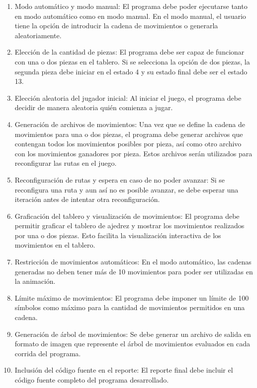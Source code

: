 \begin{enumerate}
    \item Modo automático y modo manual: El programa debe poder ejecutarse tanto en modo automático como en modo manual. En el modo manual, el usuario tiene la opción de introducir la cadena de movimientos o generarla aleatoriamente.
    \newline
    \item Elección de la cantidad de piezas: El programa debe ser capaz de funcionar con una o dos piezas en el tablero. Si se selecciona la opción de dos piezas, la segunda pieza debe iniciar en el estado 4 y su estado final debe ser el estado 13.
    \newline
    \item Elección aleatoria del jugador inicial: Al iniciar el juego, el programa debe decidir de manera aleatoria quién comienza a jugar.
    \newline
    \item Generación de archivos de movimientos: Una vez que se define la cadena de movimientos para una o dos piezas, el programa debe generar archivos que contengan todos los movimientos posibles por pieza, así como otro archivo con los movimientos ganadores por pieza. Estos archivos serán utilizados para reconfigurar las rutas en el juego.
    \newline
    \item Reconfiguración de rutas y espera en caso de no poder avanzar: Si se reconfigura una ruta y aun así no es posible avanzar, se debe esperar una iteración antes de intentar otra reconfiguración.
    \newline
    \item Graficación del tablero y visualización de movimientos: El programa debe permitir graficar el tablero de ajedrez y mostrar los movimientos realizados por una o dos piezas. Esto facilita la visualización interactiva de los movimientos en el tablero.
    \newline
    \item Restricción de movimientos automáticos: En el modo automático, las cadenas generadas no deben tener más de 10 movimientos para poder ser utilizadas en la animación.
    \newline
    \item Límite máximo de movimientos: El programa debe imponer un límite de 100 símbolos como máximo para la cantidad de movimientos permitidos en una cadena.
    \newline
    \item Generación de árbol de movimientos: Se debe generar un archivo de salida en formato de imagen que represente el árbol de movimientos evaluados en cada corrida del programa.
    \newline
    \item Inclusión del código fuente en el reporte: El reporte final debe incluir el código fuente completo del programa desarrollado.
    \newline
    
\end{enumerate}
    
